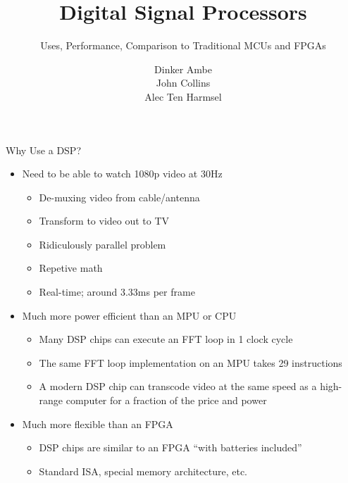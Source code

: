 \documentclass{beamer}
\begin{document}
\beamertemplatenavigationsymbolsempty

\title{Digital Signal Processors}
\subtitle{Uses, Performance, Comparison to Traditional MCUs and FPGAs}
\author{Dinker Ambe\\
    John Collins\\
Alec Ten Harmsel}
\date{}


\frame{\titlepage}

\begin{frame}{Why Use a DSP?}
    \begin{itemize}
        \item Need to be able to watch 1080p video at 30Hz
            \begin{itemize}
                \item De-muxing video from cable/antenna
                \item Transform to video out to TV
                \item Ridiculously parallel problem
                \item Repetive math
                \item Real-time; around 3.33ms per frame
            \end{itemize}
        \item Much more power efficient than an MPU or CPU
            \begin{itemize}
                \item Many DSP chips can execute an FFT loop in 1 clock cycle
                \item The same FFT loop implementation on an MPU takes 29
                    instructions
                \item A modern DSP chip can transcode video at the same speed
                    as a high-range computer for a fraction of the price and
                    power
            \end{itemize}
        \item Much more flexible than an FPGA
            \begin{itemize}
                \item DSP chips are similar to an FPGA ``with batteries
                    included''
                \item Standard ISA, special memory architecture, etc.
            \end{itemize}
    \end{itemize}
\end{frame}
\end{document}
